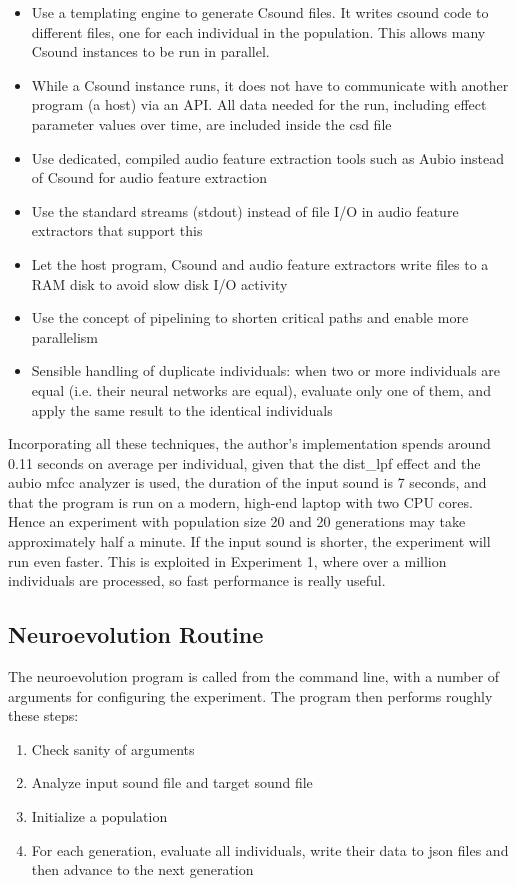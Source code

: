 \begin{itemize}  
\item Use a templating engine to generate Csound files. It writes csound code to different files, one for each individual in the population. This allows many Csound instances to be run in parallel.
\item While a Csound instance runs, it does not have to communicate with another program (a host) via an API. All data needed for the run, including effect parameter values over time, are included inside the csd file
\item Use dedicated, compiled audio feature extraction tools such as Aubio instead of Csound for audio feature extraction
\item Use the standard streams (stdout) instead of file I/O in audio feature extractors that support this
\item Let the host program, Csound and audio feature extractors write files to a RAM disk to avoid slow disk I/O activity
\item Use the concept of pipelining to shorten critical paths and enable more parallelism
\item Sensible handling of duplicate individuals: when two or more individuals are equal (i.e. their neural networks are equal), evaluate only one of them, and apply the same result to the identical individuals
\end{itemize}

Incorporating all these techniques, the author's implementation spends around 0.11 seconds on average per individual, given that the dist\_lpf effect and the aubio mfcc analyzer is used, the duration of the input sound is 7 seconds, and that the program is run on a modern, high-end laptop with two CPU cores. Hence an experiment with population size 20 and 20 generations may take approximately half a minute. If the input sound is shorter, the experiment will run even faster. This is exploited in Experiment 1, where over a million individuals are processed, so fast performance is really useful.

\subsection{Neuroevolution Routine}
The neuroevolution program is called from the command line, with a number of arguments for configuring the experiment. The program then performs roughly these steps:

\begin{enumerate}  
\item Check sanity of arguments
\item Analyze input sound file and target sound file
\item Initialize a population
\item For each generation, evaluate all individuals, write their data to json files and then advance to the next generation
\end{enumerate}

